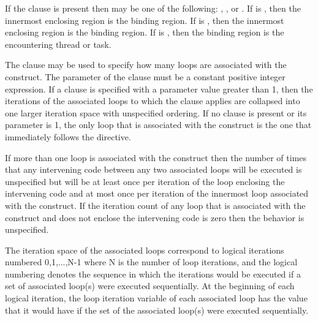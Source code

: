 If the  clause is present then  may be one of
the following: , , or . If
 is , then the innermost enclosing
 region is the binding region.  If  is
, then the innermost enclosing  region is the
binding region. If  is , then the binding
region is the encountering thread or task.


The  clause may be used to specify how many loops are associated
with the  construct. The parameter of the  clause
must be a constant positive integer expression. If a  clause is
specified with a parameter value greater than 1, then the iterations of the
associated loops to which the clause applies are collapsed into one larger
iteration space with unspecified ordering. If no  clause is
present or its parameter is 1, the only loop that is associated with the
 construct is the one that immediately follows the 
directive.

If more than one loop is associated with the  construct then the
number of times that any intervening code between any two associated
loops will be executed is unspecified but will be at least once per
iteration of the loop enclosing the intervening code and at most once
per iteration of the innermost loop associated with the construct. If the
iteration count of any loop that is associated with the  construct and does not
enclose the intervening code is zero then the behavior is unspecified.

The iteration space of the associated loops correspond to logical
iterations numbered 0,1,...,N-1 where N is the number of loop iterations, and
the logical numbering denotes the sequence in which the iterations would be
executed if a set of associated loop(s) were executed sequentially.  At the
beginning of each logical iteration, the loop iteration variable of each
associated loop has the value that it would have if the set of the associated
loop(s) were executed sequentially. 


